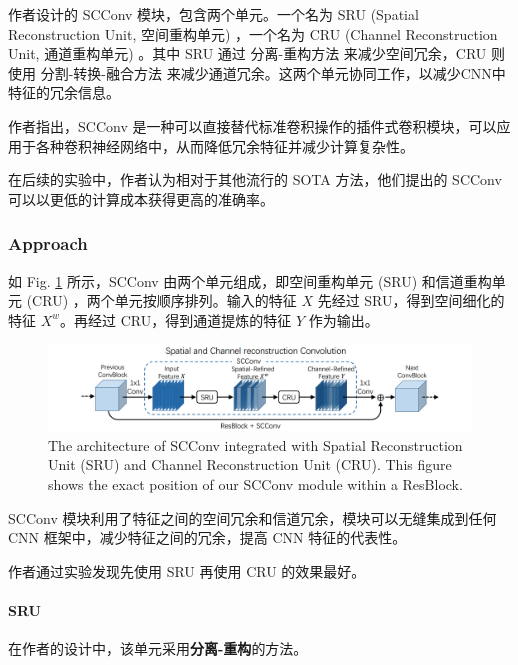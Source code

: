 \documentclass[a4paper, 10pt]{article}
\begin{document}
		作者设计的 SCConv 模块，包含两个单元。一个名为 SRU (Spatial Reconstruction Unit, 空间重构单元) ，一个名为 CRU (Channel Reconstruction Unit, 通道重构单元) 。其中 SRU 通过 分离-重构方法 来减少空间冗余，CRU 则使用 分割-转换-融合方法 来减少通道冗余。这两个单元协同工作，以减少CNN中特征的冗余信息。
		
		作者指出，SCConv 是一种可以直接替代标准卷积操作的插件式卷积模块，可以应用于各种卷积神经网络中，从而降低冗余特征并减少计算复杂性。
		
		在后续的实验中，作者认为相对于其他流行的 SOTA 方法，他们提出的 SCConv 可以以更低的计算成本获得更高的准确率。
		
		\subsubsection{Approach}
		
		如 Fig. \ref{fig: SCConv} 所示，SCConv 由两个单元组成，即空间重构单元 (SRU) 和信道重构单元 (CRU) ，两个单元按顺序排列。输入的特征 $X$ 先经过 SRU，得到空间细化的特征 $X^{w}$。再经过 CRU，得到通道提炼的特征 $Y$ 作为输出。
		
		\begin{figure}[htbp]
			\centering 
			\includegraphics[width=\columnwidth]{picture/LLIE/SCConv/SCConv}
			\caption{
				\label{fig: SCConv} 
				The architecture of SCConv integrated with Spatial Reconstruction Unit (SRU) and Channel Reconstruction Unit (CRU). This figure shows the exact position of our SCConv module within a ResBlock.
			}
		\end{figure}
		
		SCConv 模块利用了特征之间的空间冗余和信道冗余，模块可以无缝集成到任何 CNN 框架中，减少特征之间的冗余，提高 CNN 特征的代表性。
		
		作者通过实验发现先使用 SRU 再使用 CRU 的效果最好。
		
		\paragraph{SRU}
		
		在作者的设计中，该单元采用\textbf{分离-重构}的方法。
		
\end{document}
